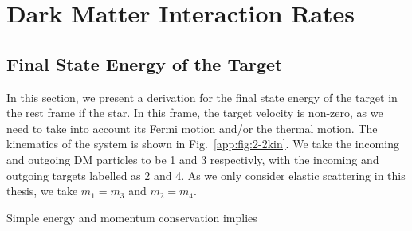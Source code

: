 \chapter{Dark Matter Interaction Rates}
\label{appendix:interaction_rates}

\section{Final State Energy of the Target}
\label{app:sec:finalstateenergy}

In this section, we present a derivation for the final state energy of the target in the rest frame if the star. In this frame, the target velocity is non-zero, as we need to take into account its Fermi motion and/or the thermal motion. The kinematics of the system is shown in Fig.~\ref{app:fig:2-2kin}. We take the incoming and outgoing DM particles to be 1 and 3 respectivly, with the incoming and outgoing targets labelled as 2 and 4. As we only consider elastic scattering in this thesis, we take $m_1 = m_3$ and $m_2 = m_4$. 

Simple energy and momentum conservation implies

